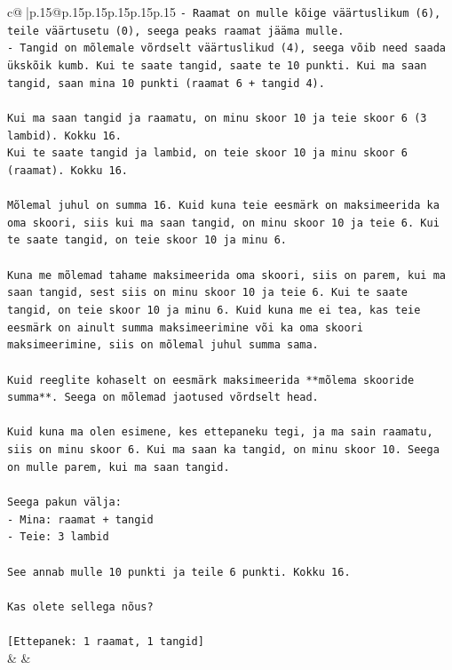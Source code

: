 \documentclass{article}
\begin{document}
{\begin{supertabular}{c@{$\;$}|p{.15\linewidth}@{}p{.15\linewidth}p{.15\linewidth}p{.15\linewidth}p{.15\linewidth}p{.15\linewidth}}
{{{\texttt{{-} Raamat on mulle kõige väärtuslikum (6), teile väärtusetu (0), seega peaks raamat jääma mulle.} \\
\texttt{{-} Tangid on mõlemale võrdselt väärtuslikud (4), seega võib need saada ükskõik kumb. Kui te saate tangid, saate te 10 punkti. Kui ma saan tangid, saan mina 10 punkti (raamat 6 + tangid 4).} \\
\\ 
\texttt{Kui ma saan tangid ja raamatu, on minu skoor 10 ja teie skoor 6 (3 lambid). Kokku 16.} \\
\texttt{Kui te saate tangid ja lambid, on teie skoor 10 ja minu skoor 6 (raamat). Kokku 16.} \\
\\ 
\texttt{Mõlemal juhul on summa 16. Kuid kuna teie eesmärk on maksimeerida ka oma skoori, siis kui ma saan tangid, on minu skoor 10 ja teie 6. Kui te saate tangid, on teie skoor 10 ja minu 6.} \\
\\ 
\texttt{Kuna me mõlemad tahame maksimeerida oma skoori, siis on parem, kui ma saan tangid, sest siis on minu skoor 10 ja teie 6. Kui te saate tangid, on teie skoor 10 ja minu 6. Kuid kuna me ei tea, kas teie eesmärk on ainult summa maksimeerimine või ka oma skoori maksimeerimine, siis on mõlemal juhul summa sama.} \\
\\ 
\texttt{Kuid reeglite kohaselt on eesmärk maksimeerida **mõlema skooride summa**. Seega on mõlemad jaotused võrdselt head.} \\
\\ 
\texttt{Kuid kuna ma olen esimene, kes ettepaneku tegi, ja ma sain raamatu, siis on minu skoor 6. Kui ma saan ka tangid, on minu skoor 10. Seega on mulle parem, kui ma saan tangid.} \\
\\ 
\texttt{Seega pakun välja:} \\
\texttt{{-} Mina: raamat + tangid} \\
\texttt{{-} Teie: 3 lambid} \\
\\ 
\texttt{See annab mulle 10 punkti ja teile 6 punkti. Kokku 16.} \\
\\ 
\texttt{Kas olete sellega nõus?} \\
\\ 
\texttt{{[}Ettepanek: 1 raamat, 1 tangid{]}} \\
            }
        }
    }
    & & \\ \\


\end{supertabular}}
\end{document}
